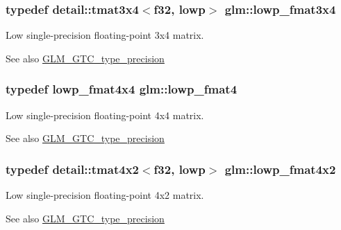 \subsubsection[{\texorpdfstring{lowp\+\_\+fmat3x4}{lowp_fmat3x4}}]{\setlength{\rightskip}{0pt plus 5cm}typedef detail\+::tmat3x4$<$f32, lowp$>$ {\bf glm\+::lowp\+\_\+fmat3x4}}\hypertarget{group__gtc__type__precision_ga366a3249a72ddc76fb3ee4f2379cf3fb}{}\label{group__gtc__type__precision_ga366a3249a72ddc76fb3ee4f2379cf3fb}
Low single-\/precision floating-\/point 3x4 matrix. \begin{DoxySeeAlso}{See also}
\hyperlink{group__gtc__type__precision}{G\+L\+M\+\_\+\+G\+T\+C\+\_\+type\+\_\+precision} 
\end{DoxySeeAlso}
\subsubsection[{\texorpdfstring{lowp\+\_\+fmat4}{lowp_fmat4}}]{\setlength{\rightskip}{0pt plus 5cm}typedef lowp\+\_\+fmat4x4 {\bf glm\+::lowp\+\_\+fmat4}}\hypertarget{group__gtc__type__precision_ga00dfb85ec53bb5f173747f73d13c1b8b}{}\label{group__gtc__type__precision_ga00dfb85ec53bb5f173747f73d13c1b8b}
Low single-\/precision floating-\/point 4x4 matrix. \begin{DoxySeeAlso}{See also}
\hyperlink{group__gtc__type__precision}{G\+L\+M\+\_\+\+G\+T\+C\+\_\+type\+\_\+precision} 
\end{DoxySeeAlso}
\subsubsection[{\texorpdfstring{lowp\+\_\+fmat4x2}{lowp_fmat4x2}}]{\setlength{\rightskip}{0pt plus 5cm}typedef detail\+::tmat4x2$<$f32, lowp$>$ {\bf glm\+::lowp\+\_\+fmat4x2}}\hypertarget{group__gtc__type__precision_ga2433f92674e42eb6a75384fbab262306}{}\label{group__gtc__type__precision_ga2433f92674e42eb6a75384fbab262306}
Low single-\/precision floating-\/point 4x2 matrix. \begin{DoxySeeAlso}{See also}
\hyperlink{group__gtc__type__precision}{G\+L\+M\+\_\+\+G\+T\+C\+\_\+type\+\_\+precision} 
\end{DoxySeeAlso}

